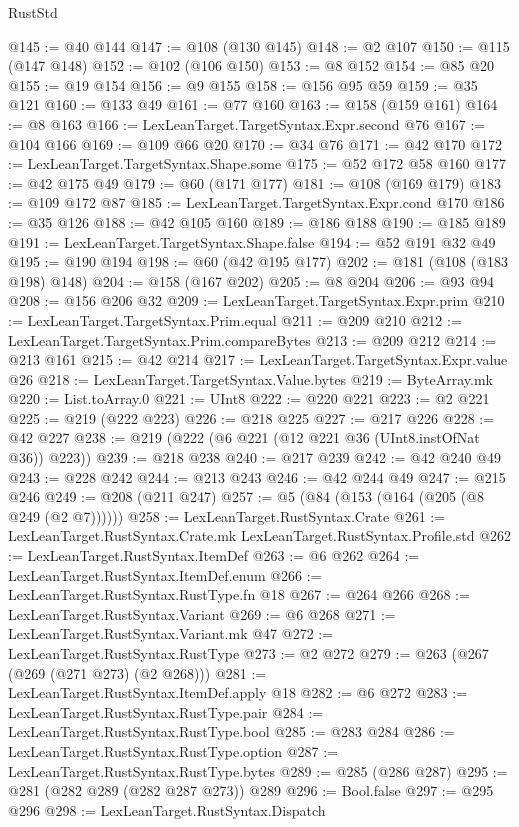\begin{lexlean}{RustStd}
\begin{coremodule}
@145 := @40 @144
@147 := @108 (@130 @145)
@148 := @2 @107
@150 := @115 (@147 @148)
@152 := @102 (@106 @150)
@153 := @8 @152
@154 := @85 @20
@155 := @19 @154
@156 := @9 @155
@158 := @156 @95 @59
@159 := @35 @121
@160 := @133 @49
@161 := @77 @160
@163 := @158 (@159 @161)
@164 := @8 @163
@166 := LexLeanTarget.TargetSyntax.Expr.second @76
@167 := @104 @166
@169 := @109 @66 @20
@170 := @34 @76
@171 := @42 @170
@172 := LexLeanTarget.TargetSyntax.Shape.some
@175 := @52 @172 @58 @160
@177 := @42 @175 @49
@179 := @60 (@171 @177)
@181 := @108 (@169 @179)
@183 := @109 @172 @87
@185 := LexLeanTarget.TargetSyntax.Expr.cond @170
@186 := @35 @126
@188 := @42 @105 @160
@189 := @186 @188
@190 := @185 @189
@191 := LexLeanTarget.TargetSyntax.Shape.false
@194 := @52 @191 @32 @49
@195 := @190 @194
@198 := @60 (@42 @195 @177)
@202 := @181 (@108 (@183 @198) @148)
@204 := @158 (@167 @202)
@205 := @8 @204
@206 := @93 @94
@208 := @156 @206 @32
@209 := LexLeanTarget.TargetSyntax.Expr.prim
@210 := LexLeanTarget.TargetSyntax.Prim.equal
@211 := @209 @210
@212 := LexLeanTarget.TargetSyntax.Prim.compareBytes
@213 := @209 @212
@214 := @213 @161
@215 := @42 @214
@217 := LexLeanTarget.TargetSyntax.Expr.value @26
@218 := LexLeanTarget.TargetSyntax.Value.bytes
@219 := ByteArray.mk
@220 := List.toArray.{0}
@221 := UInt8
@222 := @220 @221
@223 := @2 @221
@225 := @219 (@222 @223)
@226 := @218 @225
@227 := @217 @226
@228 := @42 @227
@238 := @219 (@222 (@6 @221 (@12 @221 @36 (UInt8.instOfNat @36)) @223))
@239 := @218 @238
@240 := @217 @239
@242 := @42 @240 @49
@243 := @228 @242
@244 := @213 @243
@246 := @42 @244 @49
@247 := @215 @246
@249 := @208 (@211 @247)
@257 := @5 (@84 (@153 (@164 (@205 (@8 @249 (@2 @7))))))
@258 := LexLeanTarget.RustSyntax.Crate
@261 := LexLeanTarget.RustSyntax.Crate.mk LexLeanTarget.RustSyntax.Profile.std
@262 := LexLeanTarget.RustSyntax.ItemDef
@263 := @6 @262
@264 := LexLeanTarget.RustSyntax.ItemDef.enum
@266 := LexLeanTarget.RustSyntax.RustType.fn @18
@267 := @264 @266
@268 := LexLeanTarget.RustSyntax.Variant
@269 := @6 @268
@271 := LexLeanTarget.RustSyntax.Variant.mk @47
@272 := LexLeanTarget.RustSyntax.RustType
@273 := @2 @272
@279 := @263 (@267 (@269 (@271 @273) (@2 @268)))
@281 := LexLeanTarget.RustSyntax.ItemDef.apply @18
@282 := @6 @272
@283 := LexLeanTarget.RustSyntax.RustType.pair
@284 := LexLeanTarget.RustSyntax.RustType.bool
@285 := @283 @284
@286 := LexLeanTarget.RustSyntax.RustType.option
@287 := LexLeanTarget.RustSyntax.RustType.bytes
@289 := @285 (@286 @287)
@295 := @281 (@282 @289 (@282 @287 @273)) @289
@296 := Bool.false
@297 := @295 @296
@298 := LexLeanTarget.RustSyntax.Dispatch

\end{coremodule}
\end{lexlean}
